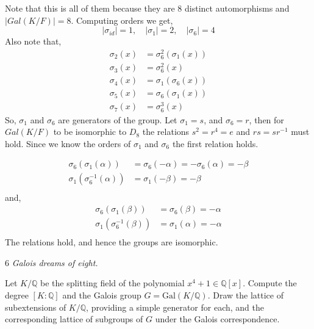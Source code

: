 \documentclass[12pt]{article}
\begin{document}
\begin{solution}
    Note that this is all of them because they are $8$ distinct automorphisms and $|Gal(K/F)| = 8$. 
    Computing orders we get, 
    \[|\sigma_{id}| = 1, \quad |\sigma_{1}| = 2,\quad |\sigma_{6}| = 4\]
    Also note that, 
    \begin{align*}
        \sigma_2(x) &= \sigma_6^2(\sigma_1(x))\\  
        \sigma_3(x) &= \sigma^2_6 (x) \\ 
        \sigma_4(x) &= \sigma_1(\sigma_6(x)) \\ 
        \sigma_5(x) &= \sigma_6(\sigma_1(x)) \\ 
        \sigma_7(x) &= \sigma^3_6 (x)
    \end{align*}
    So, $\sigma_1$ and $\sigma_6$ are generators of the group. 
    Let $\sigma_1 = s$, and $\sigma_6 = r$, then for $Gal(K/F)$ to be isomorphic to $D_8$  the relations $s^2 = r^4 = e$ and $rs = sr^{-1}$ must hold. Since we know the orders of $\sigma_1$ and $\sigma_6$ the first relation holds. 

    \begin{align*}
        \sigma_{6}(\sigma_{1} (\alpha)) &= \sigma_6(-\alpha) = -\sigma_6(\alpha) = -\beta \\ 
        \sigma_{1}(\sigma^{-1}_{6} (\alpha)) &= \sigma_1(-\beta) = - \beta \\ 
    \end{align*}
    and, 
    \begin{align*}
        \sigma_{6}(\sigma_{1} (\beta)) &= \sigma_6(\beta) = -\alpha \\ 
        \sigma_{1}(\sigma^{-1}_{6} (\beta)) &= \sigma_1(\alpha) = - \alpha \\ 
    \end{align*}
    The relations hold, and hence the groups are isomorphic. 
    \newpage 
\end{solution}


\begin{problem}{6}
\textit{Galois dreams of eight.}

    Let $K/\mathbb{Q}$ be the splitting field of the polynomial
    $x^4+1\in\mathbb{Q}[x]$. Compute the degree $[K:\mathbb{Q}]$ and the Galois group
    $G=\mathrm{Gal}(K/\mathbb{Q})$. Draw the lattice of subextensions of $K/\mathbb{Q}$,
    providing a simple generator for each, and the corresponding lattice of subgroups of $G$
    under the Galois correspondence.
\end{problem}
\end{document}
